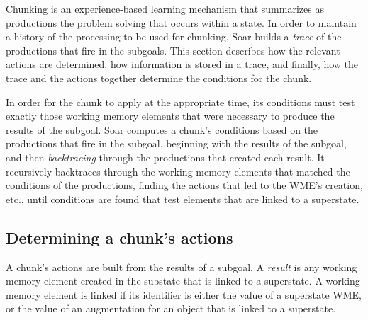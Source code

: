 Chunking is an experience-based learning mechanism that summarizes  as 
productions the problem solving that occurs within a state. In order to 
maintain a
history of the processing to be used for chunking, Soar builds a 
\emph{trace} of the productions that fire in the subgoals. This section
describes how the relevant actions are determined, how information is 
stored in a trace, and finally, how the trace and the actions together 
determine the conditions for the chunk.

In order for the chunk to apply at the appropriate time, its conditions must
test exactly those working memory elements that were necessary to produce the
results of the subgoal. Soar computes a chunk's conditions based on the
productions that fire in the subgoal, beginning with the results of the subgoal,
and then \emph{backtracing} through the productions that created each result. 
It recursively backtraces through the working memory elements that matched the
conditions of the productions, finding the actions that led to the WME's
creation, etc., until conditions are found that test elements that are linked to
a superstate. 



\subsection{Determining a chunk's actions}

A chunk's actions are built from the results of a subgoal.  A \emph{result} is
any working memory element created in the substate that is linked to a 
superstate.  A working memory element
is linked if its identifier is either the value of a superstate
WME, or the value of an augmentation  for an object that is linked to a
superstate.

